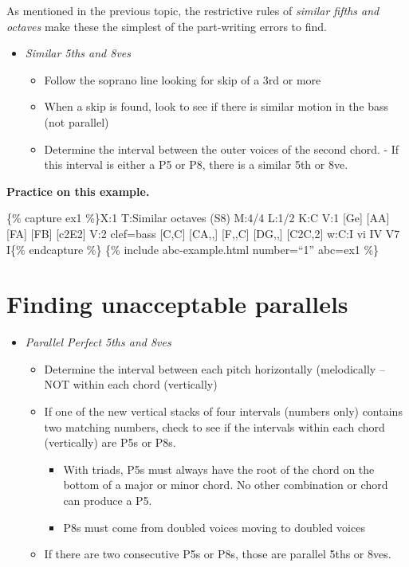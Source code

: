 \documentclass{book}
\providecommand{\tightlist}{%
  \setlength{\itemsep}{0pt}\setlength{\parskip}{0pt}}
\begin{document}
As mentioned in the previous topic, the restrictive rules of \emph{similar
fifths and octaves} make these the simplest of the part-writing errors to
find.

\begin{itemize}
\tightlist
\item
  \emph{Similar 5ths and 8ves}

  \begin{itemize}
  \tightlist
  \item
    Follow the soprano line looking for skip of a 3rd or more
  \item
    When a skip is found, look to see if there is similar motion in the bass
    (not parallel)
  \item
    Determine the interval between the outer voices of the second chord. - If
    this interval is either a P5 or P8, there is a similar 5th or 8ve.
  \end{itemize}
\end{itemize}

\textbf{Practice on this example.}

\{\% capture ex1 \%\}X:1 T:Similar octaves (S8) M:4/4 L:1/2 K:C V:1 {[}Ge{]}
{[}AA{]}\textbar{} {[}FA{]} {[}FB{]}\textbar{} {[}c2E2{]}\textbar{]} V:2
clef=bass {[}C,C{]} {[}CA,,{]}\textbar{} {[}F,,C{]} {[}DG,,{]}\textbar{}
{[}C2C,2{]}\textbar{]} w:C:I vi IV V7 I\{\% endcapture \%\} \{\% include
abc-example.html number=``1'' abc=ex1 \%\}

\hypertarget{finding-unacceptable-parallels}{%
\section{Finding unacceptable
parallels}\label{finding-unacceptable-parallels}}

\begin{itemize}
\tightlist
\item
  \emph{Parallel Perfect 5ths and 8ves}

  \begin{itemize}
  \tightlist
  \item
    Determine the interval between each pitch horizontally (melodically -- NOT
    within each chord (vertically)
  \item
    If one of the new vertical stacks of four intervals (numbers only)
    contains two matching numbers, check to see if the intervals within each
    chord (vertically) are P5s or P8s.

    \begin{itemize}
    \tightlist
    \item
      With triads, P5s must always have the root of the chord on the bottom of
      a major or minor chord. No other combination or chord can produce a P5.
    \item
      P8s must come from doubled voices moving to doubled voices
    \end{itemize}
  \item
    If there are two consecutive P5s or P8s, those are parallel 5ths or 8ves.
  \end{itemize}
\end{itemize}
\end{document}
